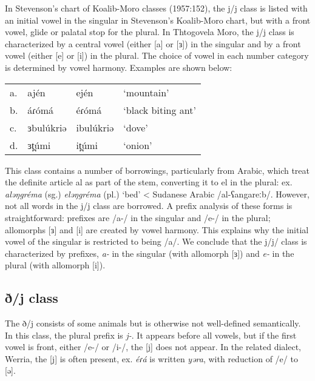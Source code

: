 In Stevenson’s chart of Koalib-Moro classes (1957:152), the j/j class is listed with an initial vowel in the singular in Stevenson’s Koalib-Moro chart, but with a front vowel, glide or palatal stop for the plural. In Thtogovela Moro, the j/j class is characterized by a central vowel (either [a] or [ɜ]) in the singular and by a front vowel (either [e] or [i]) in the plural. The choice of vowel in each number category is determined by vowel harmony. Examples are shown below:

\ea	
\begin{tabular}[t]{llll}
a.	&	ajén		&	ején		&	‘mountain’\\
b.	&	áɾómá		&	éɾómá	&	‘black biting ant’\\
c.	&	ɜbulúkriə	&	ibulúkriə&	‘dove’\\
d.	&	ɜt̪úmi		&	it̪úmi	&	‘onion’	\\
\end{tabular}
\z

This class contains a number of borrowings, particularly from Arabic, which treat the definite article al as part of the stem, converting it to el in the plural: ex. \textit{aləŋgréma} (sg.) \textit{eləŋgréma} (pl.) ‘bed’ < Sudanese Arabic /al-ʕangareːb/. However, not all words in the j/j class are borrowed. A prefix analysis of these forms is straightforward: prefixes are /a-/ in the singular and /e-/ in the plural; allomorphs [ɜ] and [i] are created by vowel harmony. This explains why the initial vowel of the singular is restricted to being /a/. We conclude that the j/j/ class is characterized by prefixes, \textit{a-} in the singular (with allomorph [ɜ]) and \textit{e-} in the plural (with allomorph [i]). 


\subsection{ð/j class}

The ð/j consists of some animals but is otherwise not well-defined semantically. In this class, the plural prefix is \textit{j-}. It appears before all vowels, but if the first vowel is front, either /e-/ or /i-/, the [j] does not appear.  In the related dialect, Werria, the [j] is often present, ex. \textit{éɾá} is written \textit{yəra}, with reduction of /e/ to [ə]. 

